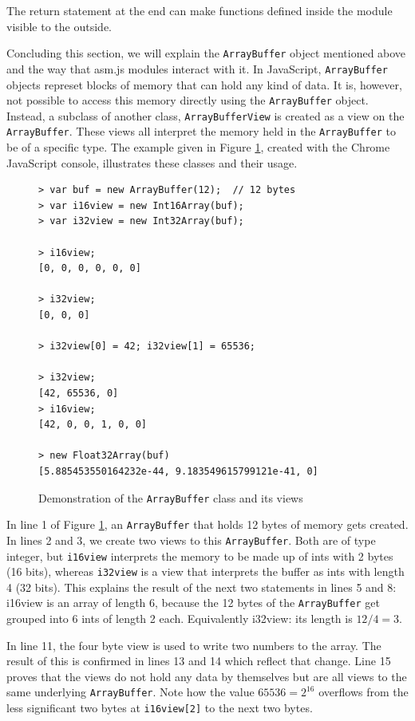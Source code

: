 \documentclass[11pt]{report}
\begin{document}
The return statement at the end can make functions defined inside the module visible to the outside.

Concluding this section, we will explain the \texttt{ArrayBuffer} object mentioned above and the way that asm.js modules interact with it. In JavaScript, \texttt{ArrayBuffer} objects represet blocks of memory that can hold any kind of data. It is, however, not possible to access this memory directly using the \texttt{ArrayBuffer} object. Instead, a subclass of another class, \texttt{ArrayBufferView} is created as a view on the \texttt{ArrayBuffer}. These views all interpret the memory held in the \texttt{ArrayBuffer} to be of a specific type. The example given in Figure \ref{arraybufferexample}, created with the Chrome JavaScript console, illustrates these classes and their usage.

\begin{figure}[ht]
\begin{lstlisting}
> var buf = new ArrayBuffer(12);  // 12 bytes
> var i16view = new Int16Array(buf);
> var i32view = new Int32Array(buf);

> i16view;
[0, 0, 0, 0, 0, 0]

> i32view;
[0, 0, 0]

> i32view[0] = 42; i32view[1] = 65536;

> i32view;
[42, 65536, 0]
> i16view;
[42, 0, 0, 1, 0, 0]

> new Float32Array(buf)
[5.885453550164232e-44, 9.183549615799121e-41, 0]
\end{lstlisting}
\caption{Demonstration of the \texttt{ArrayBuffer} class and its views}
\label{arraybufferexample}
\end{figure}

In line 1 of Figure \ref{arraybufferexample}, an \texttt{ArrayBuffer} that holds 12 bytes of memory gets created. In lines 2 and 3, we create two views to this \texttt{ArrayBuffer}. Both are of type integer, but \texttt{i16view} interprets the memory to be made up of ints with 2 bytes (16 bits), whereas \texttt{i32view} is a view that interprets the buffer as ints with length 4 (32 bits). This explains the result of the next two statements in lines 5 and 8: i16view is an array of length 6, because the 12 bytes of the \texttt{ArrayBuffer} get grouped into 6 ints of length 2 each. Equivalently i32view: its length is $12/4 = 3$.

In line 11, the four byte view is used to write two numbers to the array. The result of this is confirmed in lines 13 and 14 which reflect that change. Line 15 proves that the views do not hold any data by themselves but are all views to the same underlying \texttt{ArrayBuffer}. Note how the value $65536 = 2^{16}$ overflows from the less significant two bytes at \texttt{i16view[2]} to the next two bytes.
\end{document}
